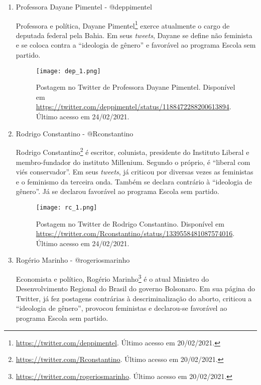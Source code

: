 \documentclass[
	12pt,				%
	openright,			%
	twoside,			%
	a4paper,			%
	english,			%
	brazil				%
	]{abntex2}
\begin{document}
\begin{anexosenv}
\begin{enumerate}
 \begin{figure}[!htbp]
    \centering
    \texttt{[image: pe\_1.png]}
    \caption{Postagem no Twitter de paulo eneas. Disponível em \url{https://twitter.com/pauloeneas/status/1320243135000215553}. Último acesso em 24/02/2021.}
 \end{figure}
 
 \item Professora Dayane Pimentel - @deppimentel\label{depdp}
 
 Professora e política, Dayane Pimentel\footnote{\url{https://twitter.com/deppimentel}. Último acesso em 20/02/2021.} exerce atualmente o cargo de deputada federal pela Bahia. Em seus \textit{tweets}, Dayane se define não feminista e se coloca contra a ``ideologia de gênero'' e favorável ao programa Escola sem partido.
 
 \begin{figure}[!htbp]
    \centering
    \texttt{[image: dep\_1.png]}
    \caption{Postagem no Twitter de Professora Dayane Pimentel. Disponível em \url{https://twitter.com/deppimentel/status/1188472288200613894}. Último acesso em 24/02/2021.}
 \end{figure}
  
 \item Rodrigo Constantino - @Rconstantino
 
 Rodrigo Constantino\footnote{\url{https://twitter.com/Rconstantino}. Último acesso em 20/02/2021.} é escritor, colunista, presidente do Instituto Liberal e membro-fundador do instituto Millenium. Segundo o próprio, é ``liberal com viés conservador''. Em seus \textit{tweets}, já criticou por diversas vezes as feministas e o feminismo da terceira onda. Também se declara contrário à ``ideologia de gênero''. Já se declarou favorável ao programa Escola sem partido.
 
 \begin{figure}[!htbp]
    \centering
    \texttt{[image: rc\_1.png]}
    \caption{Postagem no Twitter de Rodrigo Constantino. Disponível em \url{https://twitter.com/Rconstantino/status/1339558481087574016}. Último acesso em 24/02/2021.}
 \end{figure}
  
  \newpage
  
 \item Rogério Marinho - @rogeriosmarinho
 
 Economista e político, Rogério Marinho\footnote{\url{https://twitter.com/rogeriosmarinho}. Último acesso em 20/02/2021.} é o atual Ministro do Desenvolvimento Regional do Brasil do governo Bolsonaro. Em sua página do Twitter, já fez postagens contrárias à descriminalização do aborto, criticou a ``ideologia de gênero'', provocou feministas e declarou-se favorável ao programa Escola sem partido.
 

\end{enumerate}
\end{anexosenv}
\end{document}
